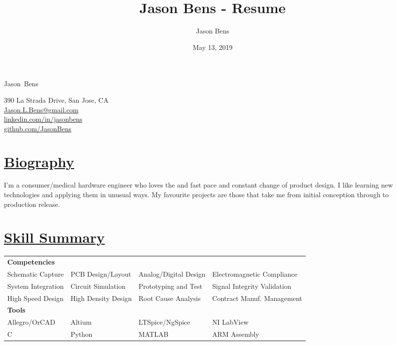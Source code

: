\documentclass[a4paper, 11pt]{article}
\title{Jason Bens - Resume}
\author{Jason Bens}
\date{May 13, 2019}
\makeatletter
\newcommand {\firstname} {Jason}
\newcommand {\lastname} {Bens}
\newcommand {\address} {390 La Strada Drive, San Jose, CA}
\newcommand {\phone} {\mbox{1-403-845-9125}}
\newcommand {\email} {\url{Jason.L.Bens@gmail.com}}
\newcommand {\linkedin} {\url{linkedin.com/in/jasonbens}}
\newcommand {\github} {\url{github.com/JasonBens}}
\newcommand {\careers} {\url{careers.stackoverflow.com/JasonBens}}
\makeatother
\begin{document}


\begin{minipage}[t]{0.4\textwidth}  
  \begin{flushright}
    {\Huge \firstname~\lastname}
  \end{flushright}
\end{minipage}
\hfill
\begin{minipage}{0.42\textwidth}
  \begin{flushright}
    \address \\
    \email \\
    \linkedin \\
    \github \\
  \end{flushright}
\end{minipage}

\hrulefill

\section{\underline{Biography}}
I'm a consumer/medical hardware engineer who loves the and fast pace and constant change of product design. I like learning new technologies and applying them in unusual ways.  My favourite projects are those that take me from initial conception through to production release.

\section{\underline{Skill Summary}}
  \begin{tabularx}{\textwidth}{l l l l}
    \textbf{Competencies} &  &  &\\
    Schematic Capture & PCB Design/Layout & Analog/Digital Design & Electromagnetic Compliance\\
    System Integration & Circuit Simulation & Prototyping and Test & Signal Integrity Validation\\
    High Speed Design & High Density Design & Root Cause Analysis & Contract Manuf. Management\\[5pt]
    \textbf{Tools} &  &  &\\
    Allegro/OrCAD & Altium & LTSpice/NgSpice & NI LabView\\
    C & Python & MATLAB & ARM Assembly\\
  \end{tabularx}
  
\end{document}
